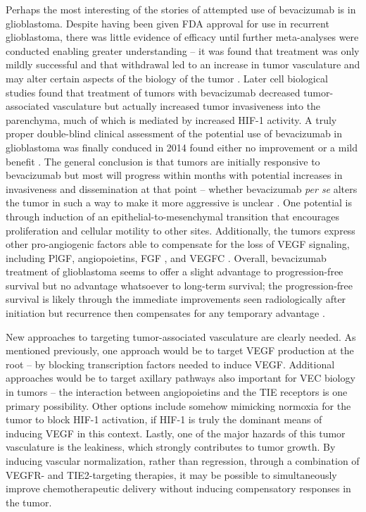 Perhaps the most interesting of the stories of attempted use of bevacizumab is in glioblastoma. Despite having been given FDA approval for use in recurrent glioblastoma, there was little evidence of efficacy until further meta-analyses were conducted enabling greater understanding -- it was found that treatment was only mildly successful and that withdrawal led to an increase in tumor vasculature and may alter certain aspects of the biology of the tumor \citep{Iwamoto2009}. Later cell biological studies found that treatment of tumors with bevacizumab decreased tumor-associated vasculature but actually increased tumor invasiveness into the parenchyma, much of which is mediated by increased HIF-1\textalpha{} activity. A truly proper double-blind clinical assessment of the potential use of bevacizumab in glioblastoma was finally conduced in 2014 found either no improvement \citep{Gilbert2014} or a mild benefit \citep{Chinot2014}. The general conclusion is that tumors are initially responsive to bevacizumab but most will progress within months with potential increases in invasiveness and dissemination at that point -- whether bevacizumab \textit{per se} alters the tumor in such a way to make it more aggressive is unclear \citep{Li2017}. One potential is through induction of an epithelial-to-mesenchymal transition that encourages proliferation and cellular motility to other sites. Additionally, the tumors express other pro-angiogenic factors able to compensate for the loss of VEGF signaling, including PlGF, angiopoietins, FGF \citep{Tamura2017}, and VEGFC \citep{Michaelsen2018}. Overall, bevacizumab treatment of glioblastoma seems to offer a slight advantage to progression-free survival but no advantage whatsoever to long-term survival; the progression-free survival is likely through the immediate improvements seen radiologically after initiation but recurrence then compensates for any temporary advantage \citep{Wick2017}. 

New approaches to targeting tumor-associated vasculature are clearly needed. As mentioned previously, one approach would be to target VEGF production at the root -- by blocking transcription factors needed to induce VEGF. Additional approaches would be to target axillary pathways also important for VEC biology in tumors -- the interaction between angiopoietins and the TIE receptors is one primary possibility. Other options include somehow mimicking normoxia for the tumor to block HIF-1\textalpha{} activation, if HIF-1\textalpha{} is truly the dominant means of inducing VEGF in this context. Lastly, one of the major hazards of this tumor vasculature is the leakiness, which strongly contributes to tumor growth. By inducing vascular normalization, rather than regression, through a combination of VEGFR- and TIE2-targeting therapies, it may be possible to simultaneously improve chemotherapeutic delivery without inducing compensatory responses in the tumor. 

